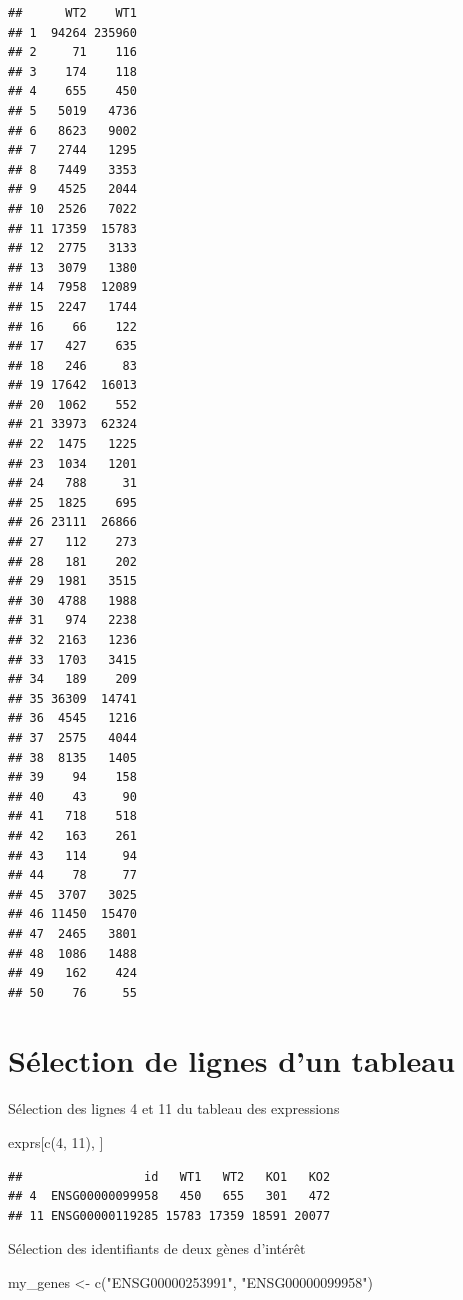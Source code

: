\documentclass[
]{book}
\newenvironment{Shaded}{\begin{snugshade}}{\end{snugshade}}
\newcommand{\DecValTok}[1]{\textcolor[rgb]{0.00,0.00,0.81}{#1}}
\newcommand{\FunctionTok}[1]{\textcolor[rgb]{0.00,0.00,0.00}{#1}}
\newcommand{\NormalTok}[1]{#1}
\newcommand{\OtherTok}[1]{\textcolor[rgb]{0.56,0.35,0.01}{#1}}
\newcommand{\StringTok}[1]{\textcolor[rgb]{0.31,0.60,0.02}{#1}}
\begin{document}
\begin{verbatim}
##      WT2    WT1
## 1  94264 235960
## 2     71    116
## 3    174    118
## 4    655    450
## 5   5019   4736
## 6   8623   9002
## 7   2744   1295
## 8   7449   3353
## 9   4525   2044
## 10  2526   7022
## 11 17359  15783
## 12  2775   3133
## 13  3079   1380
## 14  7958  12089
## 15  2247   1744
## 16    66    122
## 17   427    635
## 18   246     83
## 19 17642  16013
## 20  1062    552
## 21 33973  62324
## 22  1475   1225
## 23  1034   1201
## 24   788     31
## 25  1825    695
## 26 23111  26866
## 27   112    273
## 28   181    202
## 29  1981   3515
## 30  4788   1988
## 31   974   2238
## 32  2163   1236
## 33  1703   3415
## 34   189    209
## 35 36309  14741
## 36  4545   1216
## 37  2575   4044
## 38  8135   1405
## 39    94    158
## 40    43     90
## 41   718    518
## 42   163    261
## 43   114     94
## 44    78     77
## 45  3707   3025
## 46 11450  15470
## 47  2465   3801
## 48  1086   1488
## 49   162    424
## 50    76     55
\end{verbatim}

\hypertarget{suxe9lection-de-lignes-dun-tableau}{%
\section{Sélection de lignes d'un tableau}\label{suxe9lection-de-lignes-dun-tableau}}

Sélection des lignes 4 et 11 du tableau des expressions

\begin{Shaded}
\begin{Highlighting}[]
\NormalTok{exprs[}\FunctionTok{c}\NormalTok{(}\DecValTok{4}\NormalTok{, }\DecValTok{11}\NormalTok{), ]}
\end{Highlighting}
\end{Shaded}

\begin{verbatim}
##                 id   WT1   WT2   KO1   KO2
## 4  ENSG00000099958   450   655   301   472
## 11 ENSG00000119285 15783 17359 18591 20077
\end{verbatim}

Sélection des identifiants de deux gènes d'intérêt

\begin{Shaded}
\begin{Highlighting}[]
\NormalTok{my\_genes }\OtherTok{\textless{}{-}} \FunctionTok{c}\NormalTok{(}\StringTok{"ENSG00000253991"}\NormalTok{, }\StringTok{"ENSG00000099958"}\NormalTok{)}
\end{Highlighting}
\end{Shaded}
\end{document}
